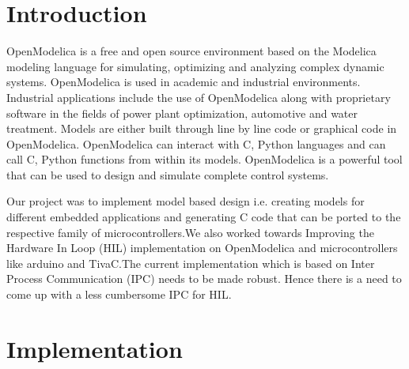 \documentclass[12pt,a4paper]{report}
\begin{document}
\chapter{\textbf{Introduction}}
OpenModelica is a free and open source environment based on the Modelica modeling language for simulating, optimizing and analyzing complex dynamic systems. OpenModelica is used in academic and industrial environments. Industrial applications include the use of OpenModelica along with proprietary software in the fields of power plant optimization, automotive and water treatment. Models are either built through line by line code or graphical code in OpenModelica. OpenModelica can interact with C, Python languages and can call C, Python functions from within its models. OpenModelica is a powerful tool that can be used to design and simulate complete control systems. 

Our project was to implement model based design i.e. creating models for different embedded applications and generating C code that can be ported to the respective family of microcontrollers.We also worked towards Improving the Hardware In Loop (HIL) implementation on OpenModelica and microcontrollers like arduino and TivaC.The current implementation which is based on Inter Process Communication (IPC) needs to be made robust. Hence there is a need to come up with a less cumbersome  IPC for HIL.


\chapter{\textbf{Implementation}}
\end{document}

